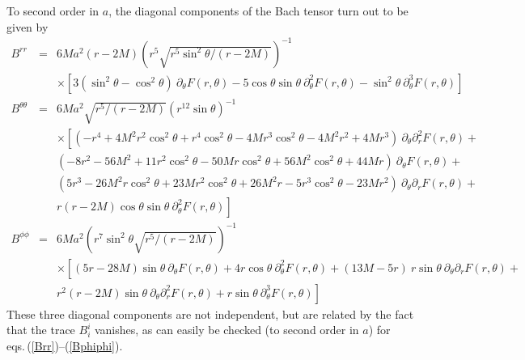 To second order in $a$, the diagonal components of the Bach tensor
turn out to be given by 
\begin{eqnarray}
B^{rr} &=& 6 M a^2(r-2M)  \left(r^5 \sqrt{r^5 \sin^2\theta /(r-2M)}\right)^{-1}
\nonumber\\&& \times\left[ 3 (\sin^2\theta-\cos^2\theta)
\ \partial_{\theta}F(r,\theta)- 5 \cos\theta \sin\theta  
\ \partial^2_{\theta}F(r,\theta) - \sin^2\theta
\ \partial^3_{\theta}F(r,\theta) \right]\label{Brr}\\
B^{\theta\theta} &=&6 M a^2 \sqrt{r^5  /(r-2M)} 
\left(r^{12} \sin\theta\right)^{-1} \nonumber\\&&
\times\left[ (-r^4+4M^2r^2\cos^2\theta+r^4\cos^2\theta
-4Mr^3\cos^2\theta-4M^2r^2+4Mr^3)\ \partial_{\theta}\partial^2_{r}F(r,\theta) + 
\right. \nonumber\\&&
(-8r^2-56M^2+11r^2\cos^2\theta-50Mr\cos^2\theta+56M^2\cos^2\theta+44Mr)
\ \partial_{\theta}F(r,\theta) +
\nonumber\\&& (5r^3-26M^2r\cos^2\theta+23Mr^2\cos^2\theta+
26M^2r-5r^3\cos^2\theta-23Mr^2)
\ \partial_{\theta}\partial_{r}F(r,\theta) + \nonumber\\&& \left. 
r(r-2M)\cos\theta\sin\theta
\ \partial^2_{\theta}F(r,\theta) \right] \label{Bthth}\\
B^{\phi\phi} &=& 6 M a^2 
\left(r^7 \sin^{2}\theta \sqrt{r^5 /(r-2M)}\right)^{-1} \nonumber\\&&
\times\left[ (5r-28M)\sin\theta\ \partial_{\theta}F(r,\theta) + 
4r\cos\theta\ \partial^2_{\theta}F(r,\theta) + (13M-5r)\ r\sin\theta
\ \partial_{\theta}\partial_{r}F(r,\theta) + \right. \nonumber\\&& \left. r^2(r-2M)\sin\theta 
\ \partial_{\theta}\partial^2_{r}F(r,\theta) + r\sin\theta
\ \partial^3_{\theta}F(r,\theta) \right]\label{Bphiphi}
\end{eqnarray}
These three diagonal components are not independent, but are related
by the fact that the trace $B^i_i$ vanishes, as can easily be checked
(to second order in $a$) for eqs.\,(\ref{Brr})--(\ref{Bphiphi}).

